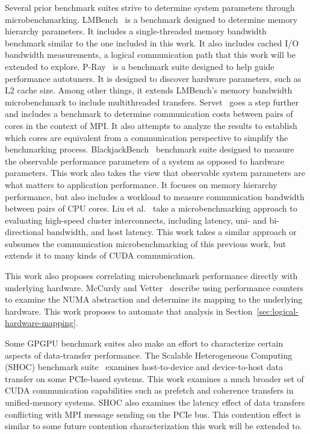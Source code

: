 Several prior benchmark suites strive to determine system parameters through microbenchmarking.
LMBench~\cite{mcvoy1996lmbench} is a benchmark designed to determine memory hierarchy parameters.
It includes a single-threaded memory bandwidth benchmark similar to the one included in this work.
It also includes cached I/O bandwidth measurements, a logical communication path that this work will be extended to explore.
P-Ray~\cite{duchateau2008p} is a benchmark suite designed to help guide performance autotuners.
It is designed to discover hardware parameters, such as L2 cache size.
Among other things, it extends LMBench's memory bandwidth microbenchmark to include multithreaded transfers.
Servet~\cite{gonzalez2010servet} goes a step further and includes a benchmark to determine communication costs between pairs of cores in the context of MPI.
It also attempts to analyze the results to establish which cores are equivalent from a communication perspective to simplify the benchmarking process.
BlackjackBench~\cite{danalis2012blackjackbench} benchmark suite designed to measure the observable performance parameters of a system as opposed to hardware parameters.
This work also takes the view that observable system parameters are what matters to application performance.
It focuses on memory hierarchy performance, but also includes a workload to measure communication bandwidth between pairs of CPU cores.
Liu et al.~\cite{liu2004microbenchmark} take a microbenchmarking approach to evaluating high-speed cluster interconnects, including latency, uni- and bi-directional bandwidth, and host latency.
This work takes a similar approach or subsumes the communication microbenchmarking of this previous work, but extends it to many kinds of CUDA communication.

This work also proposes correlating microbenchmark performance directly with underlying hardware.
McCurdy and Vetter~\cite{mccurdy2010memphis} describe using performance counters to examine the NUMA abstraction and determine its mapping to the underlying hardware.
This work proposes to automate that analysis in Section~\ref{sec:logical-hardware-mapping}.

Some GPGPU benchmark suites also make an effort to characterize certain aspects of data-transfer performance.
The Scalable Heterogeneous Computing (SHOC) benchmark suite~\cite{danalis2010scalable} examines host-to-device and device-to-host data transfer on some PCIe-based systems.
This work examines a much broader set of CUDA communication capabilities such as prefetch and coherence transfers in unified-memory systems.
SHOC also examines the latency effect of data transfers conflicting with MPI message sending on the PCIe bus.
This contention effect is similar to some future contention characterization this work will be extended to.

